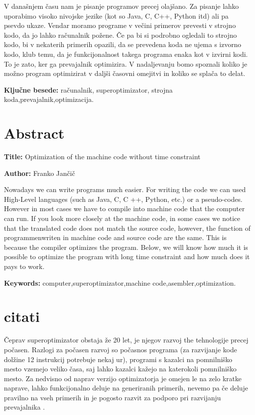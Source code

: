 \documentclass[a4paper, 12pt]{book}
\newcommand{\ttitleEn}{Optimization of the machine code without time constraint}
\newcommand{\tauthor}{Franko Jančič}
\newcommand{\tkeywords}{računalnik, superoptimizator, strojna koda,prevajalnik,optimizacija}
\newcommand{\tkeywordsEn}{computer,superoptimizator,machine code,asembler,optimization}
\newcommand{\clearemptydoublepage}{\newpage{\pagestyle{empty}\cleardoublepage}}
\begin{document}
\noindent 
V današnjem času nam je pisanje programov precej olajšano. Za pisanje lahko uporabimo visoko nivojske jezike (kot so Java, C, C++, Python itd) ali pa psevdo ukaze. Vendar moramo programe v večini primerov prevesti v strojno kodo, da jo lahko računalnik požene. Če pa bi si podrobno ogledali to strojno kodo, bi v nekaterih primerih opazili, da se prevedena koda ne ujema s izvorno kodo, klub temu, da je funkcijonalnost takega programa enaka kot v izvirni kodi. To je zato, ker ga prevajalnik optimizira. V nadaljevanju bomo spoznali koliko je možno program optimizirat v daljši časovni omejitvi in koliko se splača to delat.
\bigskip

\noindent\textbf{Ključne besede:} \tkeywords.
\clearemptydoublepage

\chapter*{Abstract}

\noindent\textbf{Title:} \ttitleEn
\bigskip

\noindent\textbf{Author:} \tauthor
\bigskip

\noindent Nowadays we can write programs much easier. For writing the code we can used High-Level languages (such as Java, C, C ++, Python, etc.) or a pseudo-codes. However in most cases we have to compile into machine code that the computer can run. If you look more closely at the machine code, in some cases we notice that the translated code does not match the source code, however, the function of programmenwriten in machine code and source code are the same. This is because the compiler optimizes the program. Below, we will know how much it is possible to optimize the program with long time constraint and how much does it pays to work.
\bigskip

\noindent\textbf{Keywords:} \tkeywordsEn.
\clearemptydoublepage

\mainmatter
\setcounter{page}{1}
\pagestyle{fancy}

\chapter{citati}

Čeprav superoptimizator obstaja že 20 let, je njegov razvoj the tehnologije precej počasen. Razlogi za počasen razvoj so počasnos programa (za razvijanje kode dolžine 12 instrukcij potrebuje nekaj ur), programi s kazalci na pomnilniško mesto vzemejo veliko časa, saj lahko kazalci kažejo na katerokoli pomnilniško mesto. Za nedvisno od naprav verzijo optimizatorja je omejen le na zelo kratke naprave, lahko funkcijonalno deluje na generiranih primerih, nevemo pa če deluje pravilno na vseh primerih in je pogosto razvit za podporo pri razvijanju prevajalnika \cite{razlog}.
\end{document}
